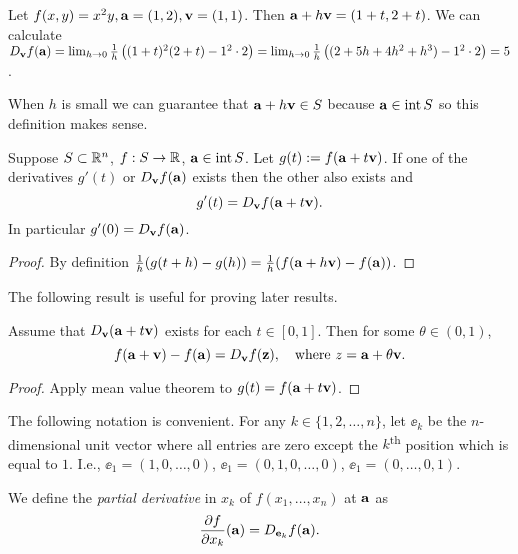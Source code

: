 \begin{example}
 Let $f(x,y) = x^2 y, \aa = (1,2), \vv = (1,1)$. Then $\aa + h\vv = (1+t, 2+t)$.
 We can calculate $D_{\vv}f(\aa) = \lim_{h\to 0} \frac{1}{h}\left((1+t)^2(2+t) - 1^2\cdot 2\right)
 = \lim_{h\to 0} \frac{1}{h}\left((2+5h+4h^2+h^3) - 1^2\cdot 2\right) = 5$.
\end{example}


When \(h\) is small we can guarantee that \(\aa + h \vv \in S\) because \(\aa\in \operatorname{int} S\) so this definition makes sense.


\begin{theorem*}
    Suppose \(S\subset \bR^n\), \(f:S\to \bR\), \(\aa \in \operatorname{int} S\).
    Let \(g(t) := f(\aa + t\vv)\).
    If one of the derivatives \(g'(t)\) or \(D_\vv f(\aa)\) exists then the other also exists and
    \[
        g'(t) = D_{\vv}f(\aa+t \vv).
    \]
    In particular \(g'(0) = D_{\vv}f(\aa)\).
\end{theorem*}

\begin{proof}
    By definition \(\frac{1}{h}(g(t+h)-g(h)) =\frac{1}{h}(f(\aa+h \vv) - f(\aa)) \).
\end{proof}

The following result is useful for proving later results.

\begin{theorem*}
    Assume that \(D_{\vv}(\aa+t\vv)\)  exists for each \(t\in [0,1]\). Then for some \(\theta \in (0,1)\),
    \[
        f(\aa+\vv) - f(\aa) = D_{\vv}f (\zz),
        \quad
        \text{where \(z=\aa + \theta \vv\)}.
    \]
\end{theorem*}

\begin{proof}
    Apply mean value theorem to \(g(t) = f(\aa+t\vv)\).
\end{proof}


The following notation is convenient.
For any \(k\in\{1,2,\ldots,n\}\),
let \(\ee_k\) be the \(n\)-dimensional unit vector where all entries are zero except the \(k\)\textsuperscript{th} position which is equal to \(1\).
I.e., \( \ee_1=(1,0,\ldots,0)  \),  \( \ee_1=(0,1,0,\ldots,0)  \),  \( \ee_1=(0,\ldots,0,1)  \).

\begin{definition}
    We define the \emph{partial derivative} in \(x_k\) of \(f(x_1,\ldots,x_n)\) at \(\aa\) as
    \[
        \frac{\partial f}{\partial x_k}(\aa) = D_{\ee_k}f(\aa).
    \]
\end{definition}


